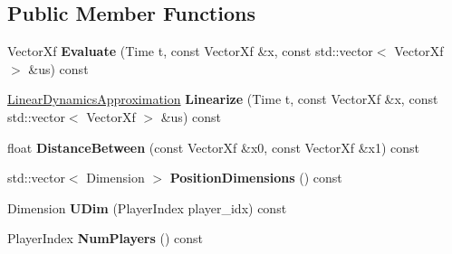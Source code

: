 \subsection*{Public Member Functions}
\begin{DoxyCompactItemize}
\item 
Vector\+Xf {\bfseries Evaluate} (Time t, const Vector\+Xf \&x, const std\+::vector$<$ Vector\+Xf $>$ \&us) const \hypertarget{classilqgames_1_1_two_player_unicycle4_d_abeb19eec56195a30c0ec726178d5a316}{}\label{classilqgames_1_1_two_player_unicycle4_d_abeb19eec56195a30c0ec726178d5a316}

\item 
\hyperlink{structilqgames_1_1_linear_dynamics_approximation}{Linear\+Dynamics\+Approximation} {\bfseries Linearize} (Time t, const Vector\+Xf \&x, const std\+::vector$<$ Vector\+Xf $>$ \&us) const \hypertarget{classilqgames_1_1_two_player_unicycle4_d_a07a9e89a52e8177dad08cccc80d343ae}{}\label{classilqgames_1_1_two_player_unicycle4_d_a07a9e89a52e8177dad08cccc80d343ae}

\item 
float {\bfseries Distance\+Between} (const Vector\+Xf \&x0, const Vector\+Xf \&x1) const \hypertarget{classilqgames_1_1_two_player_unicycle4_d_ac04d9ced33073d828df5cc91035b4854}{}\label{classilqgames_1_1_two_player_unicycle4_d_ac04d9ced33073d828df5cc91035b4854}

\item 
std\+::vector$<$ Dimension $>$ {\bfseries Position\+Dimensions} () const \hypertarget{classilqgames_1_1_two_player_unicycle4_d_abfd8456666e27e97b42fc7212522eab2}{}\label{classilqgames_1_1_two_player_unicycle4_d_abfd8456666e27e97b42fc7212522eab2}

\item 
Dimension {\bfseries U\+Dim} (Player\+Index player\+\_\+idx) const \hypertarget{classilqgames_1_1_two_player_unicycle4_d_ab669f54b874b51fd96ea28313d737131}{}\label{classilqgames_1_1_two_player_unicycle4_d_ab669f54b874b51fd96ea28313d737131}

\item 
Player\+Index {\bfseries Num\+Players} () const \hypertarget{classilqgames_1_1_two_player_unicycle4_d_ac2d8077da95177fc424cc49373c90c3a}{}\label{classilqgames_1_1_two_player_unicycle4_d_ac2d8077da95177fc424cc49373c90c3a}

\end{DoxyCompactItemize}
